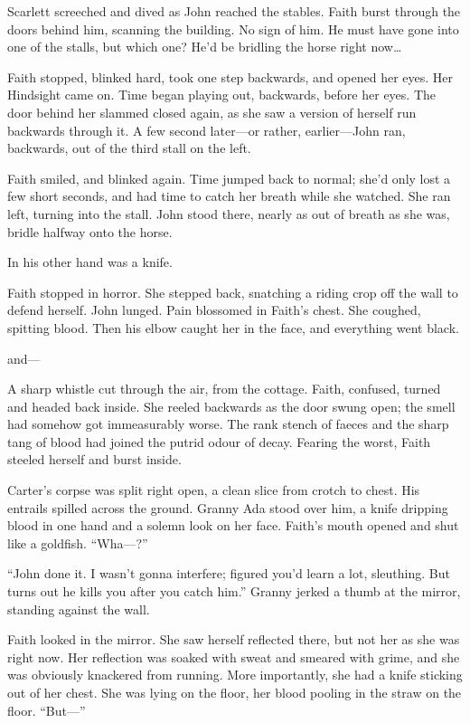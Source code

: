 Scarlett screeched and dived as John reached the stables.
Faith burst through the doors behind him, scanning the building.
No sign of him.
He must have gone into one of the stalls, but which one?
He'd be bridling the horse right now{\dots}

Faith stopped, blinked hard, took one step backwards, and opened her eyes.
Her Hindsight came on.
Time began playing out, backwards, before her eyes.
The door behind her slammed closed again, as she saw a version of herself run backwards through it.
A few second later---or rather, earlier---John ran, backwards, out of the third stall on the left.

Faith smiled, and blinked again.
Time jumped back to normal; she'd only lost a few short seconds, and had time to catch her breath while she watched.
She ran left, turning into the stall.
John stood there, nearly as out of breath as she was, bridle halfway onto the horse.

In his other hand was a knife.

Faith stopped in horror.
She stepped back, snatching a riding crop off the wall to defend herself.
John lunged.
Pain blossomed in Faith's chest.
She coughed, spitting blood.
Then his elbow caught her in the face, and everything went black.

\storybreak

{\foretellingstoryrepeat}
and---

A sharp whistle cut through the air, from the cottage.
Faith, confused, turned and headed back inside.
She reeled backwards as the door swung open; the smell had somehow got immeasurably worse.
The rank stench of faeces and the sharp tang of blood had joined the putrid odour of decay.
Fearing the worst, Faith steeled herself and burst inside.

Carter's corpse was split right open, a clean slice from crotch to chest.
His entrails spilled across the ground.
Granny Ada stood over him, a knife dripping blood in one hand and a solemn look on her face.
Faith's mouth opened and shut like a goldfish.
``Wha---?''

``John done it.
I wasn't gonna interfere; figured you'd learn a lot, sleuthing.
But turns out he kills you after you catch him.''
Granny jerked a thumb at the mirror, standing against the wall.

Faith looked in the mirror.
She saw herself reflected there, but not her as she was right now.
Her reflection was soaked with sweat and smeared with grime, and she was obviously knackered from running.
More importantly, she had a knife sticking out of her chest.
She was lying on the floor, her blood pooling in the straw on the floor.
``But---''

